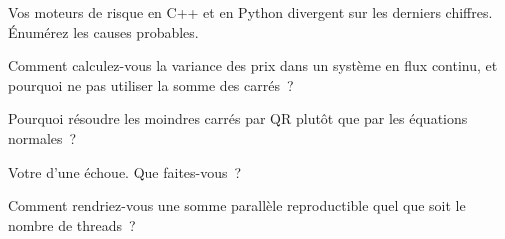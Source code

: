 \begin{interviewq}\label{iq:qm:floating-point-and-numerical-linear-algebra:2}
Vos moteurs de risque en C++ et en Python divergent sur les derniers chiffres. Énumérez les causes probables.
\end{interviewq}

\begin{interviewq}\label{iq:qm:floating-point-and-numerical-linear-algebra:3}
Comment calculez-vous la variance des prix dans un système en flux continu, et pourquoi ne pas utiliser la somme des carrés~?
\end{interviewq}

\begin{interviewq}\label{iq:qm:floating-point-and-numerical-linear-algebra:4}
Pourquoi résoudre les moindres carrés par QR plutôt que par les équations normales~?
\end{interviewq}

\begin{interviewq}\label{iq:qm:floating-point-and-numerical-linear-algebra:5}
Votre  d'une  échoue. Que faites-vous~?
\end{interviewq}

\begin{interviewq}\label{iq:qm:floating-point-and-numerical-linear-algebra:6}
Comment rendriez-vous une somme parallèle reproductible quel que soit le nombre de threads~?
\end{interviewq}
